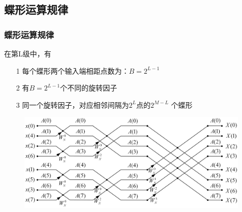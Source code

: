 \documentclass[notheorems,compress,mathserif,table]{beamer}
\begin{document}
\subsection{蝶形运算规律}
\begin{frame}[shrink]\frametitle{蝶形运算规律}
在第L级中，有
\begin{enumerate}
  \item [1] 每个蝶形两个输入端相距点数为：$B=2^{L-1}$
  \item [2] 有$B=2^{L-1}$个不同的旋转因子
  \item [3] 同一个旋转因子，对应相邻间隔为$2^L$点的$2^{M-L}$ 个蝶形
\end{enumerate}
\begin{figure}[h]
  \centering
  \includegraphics[width=0.99\textwidth]{8dftThird.jpg}
\end{figure}
\end{frame}
%
%
%
\end{document}
